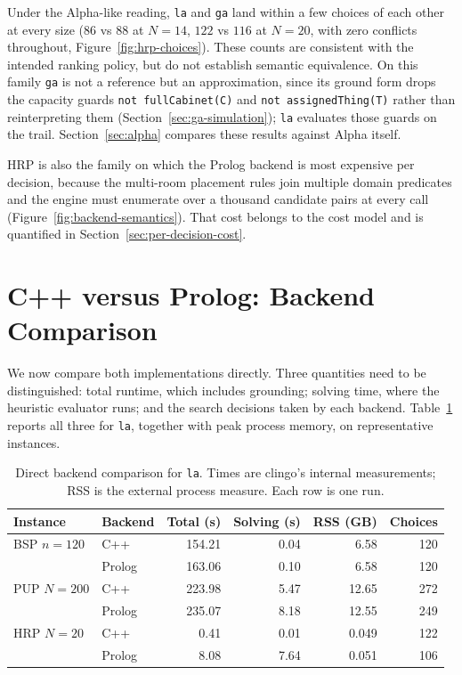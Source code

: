 Under the Alpha-like reading, \texttt{la} and \texttt{ga} land within a few choices of each other at every size ($86$ vs $88$ at $N=14$, $122$ vs $116$ at $N=20$, with zero conflicts throughout, Figure~\ref{fig:hrp-choices}). These counts are consistent with the intended ranking policy, but do not establish semantic equivalence. On this family \texttt{ga} is not a reference but an approximation, since its ground form drops the capacity guards \texttt{not fullCabinet(C)} and \texttt{not assignedThing(T)} rather than reinterpreting them (Section~\ref{sec:ga-simulation}); \texttt{la} evaluates those guards on the trail. Section~\ref{sec:alpha} compares these results against Alpha itself.

HRP is also the family on which the Prolog backend is most expensive per decision, because the multi-room placement rules join multiple domain predicates and the engine must enumerate over a thousand candidate pairs at every call (Figure~\ref{fig:backend-semantics}). That cost belongs to the cost model and is quantified in Section~\ref{sec:per-decision-cost}.

\FloatBarrier
\section{C++ versus Prolog: Backend Comparison}
\label{sec:backend-summary}

We now compare both implementations directly. Three quantities need to be distinguished: total runtime, which includes grounding; solving time, where the heuristic evaluator runs; and the search decisions taken by each backend. Table~\ref{tab:backend-comparison} reports all three for \texttt{la}, together with peak process memory, on representative instances.

\begin{table}[htbp]
\centering
\small
\setlength{\tabcolsep}{4pt}
\begin{tabular}{llrrrr}
\toprule
\textbf{Instance} & \textbf{Backend} & \textbf{Total (s)} & \textbf{Solving (s)} & \textbf{RSS (GB)} & \textbf{Choices}\\
\midrule
BSP $n=120$ & C++ & 154.21 & 0.04 & 6.58 & 120\\
            & Prolog & 163.06 & 0.10 & 6.58 & 120\\
\addlinespace
PUP $N=200$ & C++ & 223.98 & 5.47 & 12.65 & 272\\
            & Prolog & 235.07 & 8.18 & 12.55 & 249\\
\addlinespace
HRP $N=20$ & C++ & 0.41 & 0.01 & 0.049 & 122\\
            & Prolog & 8.08 & 7.64 & 0.051 & 106\\
\bottomrule
\end{tabular}
\caption{Direct backend comparison for \texttt{la}. Times are clingo's internal measurements; RSS is the external process measure. Each row is one run.}
\label{tab:backend-comparison}
\end{table}

